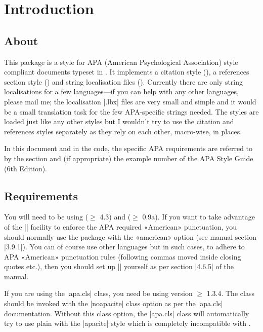 \documentclass{ltxdockit}
\begin{document}
\printtitlepage
\tableofcontents

\section{Introduction}
\label{int}

\subsection{About}

This package is a  style for APA (American Psychological
Association) style compliant documents typeset in \latex. It implements a
citation style (), a references section style
() and string localisation files ().
Currently there are only string localisations for a few languages---if you can help with any other languages, please mail me; the
localisation |.lbx| files are very small and simple and it would be a small
translation task for the few APA-specific strings needed.
The styles are loaded just like any other  styles but I
wouldn't try to use the citation and references styles separately as they
rely on each other, macro-wise, in places.

In this document and in the code, the specific APA requirements are
referred to by the section and (if appropriate) the example number of the
APA Style Guide (6th Edition).

\subsection{Requirements}\label{ref:req}

You will need to be using  ($\geq$ 4.3) and 
($\geq$ 0.9a). If you want to take advantage of the 
|\DeclareQuotePunctuation| facility to enforce the APA required «American»
punctuation, you should normally use the  package with the «american»
option (see  manual section |3.9.1|). You can of course use
other languages but in such cases, to adhere to APA «American» punctuation
rules (following commas moved inside closing quotes etc.), then you should
set up |\DeclareQuotePunctuation| yourself as per section |4.6.5| of the
 manual.

If you are using the |apa.cls| \latex class, you need be using version
$\geq$ 1.3.4. The class should be invoked with the |noapacite| class option
as per the |apa.cls| documentation. Without this class option, the
|apa.cls| class will automatically try to use plain \bibtex with the
|apacite| style which is completely incompatible with .
\end{document}
